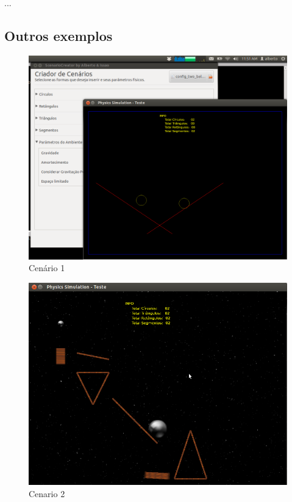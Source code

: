 ...

\subsection{Outros exemplos}

\begin{figure}[H]
	\centering
	\includegraphics[scale=0.3]{images/cenario-two-balls.png}
	\caption{Cenário 1}
	\hspace{0.5cm}
\end{figure}  

  \begin{figure}[H]
	  \centering
    \includegraphics[scale=0.4]{images/cenario-todos.png}
	  \caption{Cenario 2}
  \end{figure}

